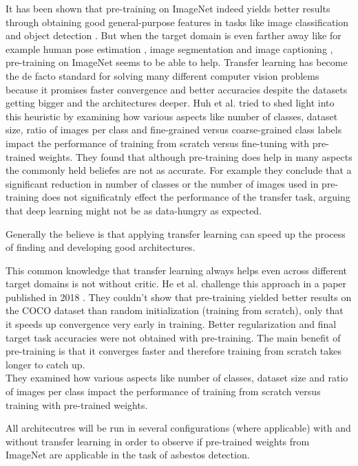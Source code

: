 It has been shown that pre-training on ImageNet indeed yields better results through obtaining good general-purpose features in tasks like image classification \cite{sharif2014cnn} and object detection \cite{girshick2014rich, sermanet2013overfeat}. But when the target domain is even farther away like for example human pose estimation \cite{carreira2016human}, image segmentation \cite{dai2016instance} and image captioning \cite{donahue2015long, karpathy2015deep}, pre-training on ImageNet seems to be able to help. Transfer learning has become the de facto standard for solving many different computer vision problems because it promises faster convergence and better accuracies despite the datasets getting bigger and the architectures deeper. Huh et al. \cite{huh2016makes} tried to shed light into this heuristic by examining how various aspects like number of classes, dataset size, ratio of  images per class and fine-grained versus coarse-grained class labels impact the performance of training from scratch versus fine-tuning with pre-trained weights. They found that although pre-training does help in many aspects the commonly held beliefes are not as accurate. For example they conclude that a significant reduction in number of classes or the number of images used in pre-training does not significatnly effect the performance of the transfer task, arguing that deep learning might not be as data-hungry as expected.

Generally the believe is that applying transfer learning can speed up the process of finding and developing good architectures.

This common knowledge that transfer learning always helps even across different target domains is not without critic. He et al. challenge this approach in a paper published in 2018 \cite{he2018rethinking}. They couldn't show that pre-training yielded better results on the COCO dataset than random initialization (training from scratch), only that it speeds up convergence very early in training. Better regularization and final target task accuracies were not obtained with pre-training. The main benefit of pre-training is that it converges faster and therefore training from scratch takes longer to catch up.
\\
They examined how various aspects like number of classes, dataset size and ratio of images per class impact the performance of training from scratch versus training with pre-trained weights.

All architecutres will be run in several configurations (where applicable) with and without transfer learning in order to observe if pre-trained weights from ImageNet are applicable in the task of asbestos detection.

